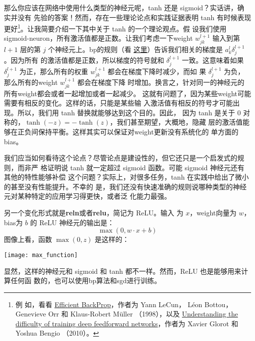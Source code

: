 那么你应该在网络中使用什么类型的神经元呢，tanh 还是 sigmoid？实话讲，确实并没有
先验的答案！然而，存在一些理论论点和实践证据表明 tanh 有时候表现更好\footnote{例
  如，看看 \href{http://yann.lecun.com/exdb/publis/pdf/lecun-98b.pdf}{Efficient
    BackProp}，作者为 Yann LeCun， Léon Bottou， Genevieve Orr 和 Klaus-Robert
  Müller （1998），以及
  \href{http://jmlr.org/proceedings/papers/v9/glorot10a/glorot10a.pdf}{Understanding
    the difficulty of training deep feedforward networks}，作者为 Xavier Glorot
  和 Yoshua Bengio （2010）。}。让我简要介绍一下其中关于 tanh 的一个理论观点。假
设我们使用 \gls*{sigmoid-neuron}，所有激活值都是正数。让我们考虑一下\gls*{weight}
$w_{jk}^{l+1}$ 输入到第 $l+1$ 层的第 $j$ 个神经元上。\gls*{bp}的规则（看%
  \hyperref[eq:bp4]{这里}）告诉我们相关的梯度是 $a_k^l\delta_j^{l+1}$。因为所有
的激活值都是正数，所以梯度的符号就和 $\delta_j^{l+1}$ 一致。这意味着如果
$\delta_j^{l+1}$ 为正，那么所有的权重 $w_{jk}^{l+1}$ 都会在梯度下降时减少，而如
果 $\delta_j^{l+1}$ 为负，那么所有的\gls*{weight} $w_{jk}^{l+1}$ 都会在梯度下降
时增加。换言之，针对同一的神经元的所有\gls*{weight}都会或者一起增加或者一起减少。
这就有问题了，因为某些\gls*{weight}可能需要有相反的变化。这样的话，只能是某些输
入激活值有相反的符号才可能出现。所以，我们用 tanh 替换就能够达到这个目的。因此，
因为 tanh 是关于 $0$ 对称的，$\tanh(-z) = -\tanh(z)$，我们甚至期望，大概地，隐藏
层的激活值能够在正负间保持平衡。这样其实可以保证对\gls*{weight}更新没有系统化的
单方面的\gls*{bias}。

我们应当如何看待这个论点？尽管论点是建设性的，但它还只是一个启发式的规则，而非严
格证明说 tanh 就一定超过 sigmoid 函数。可能 sigmoid 神经元还有其他的特性能够补偿
这个问题？实际上，对很多任务，tanh 在实践中给出了微小的甚至没有性能提升。不幸的
是，我们还没有快速准确的规则说哪种类型的神经元对某种特定的应用学习得更快，或者泛
化能力最强。

另一个变化形式就是\textbf{\gls{reln}}或者\textbf{\gls{relu}}，简记为 ReLU。输入
为 $x$，\gls*{weight}向量为 $w$，\gls*{bias}为 $b$ 的 ReLU 神经元的输出是：
\begin{equation}
  \max(0, w \cdot x+b)
  \label{eq:112}\tag{112}
\end{equation}
图像上看，函数 $\max(0,z)$ 是这样的：
\begin{center}
  \texttt{[image: max\_function]}
\end{center}

显然，这样的神经元和 sigmoid 和 tanh 都不一样。然而，ReLU 也是能够用来计算任何函
数的，也可以使用\gls*{bp}算法和\gls*{sgd}进行训练。

